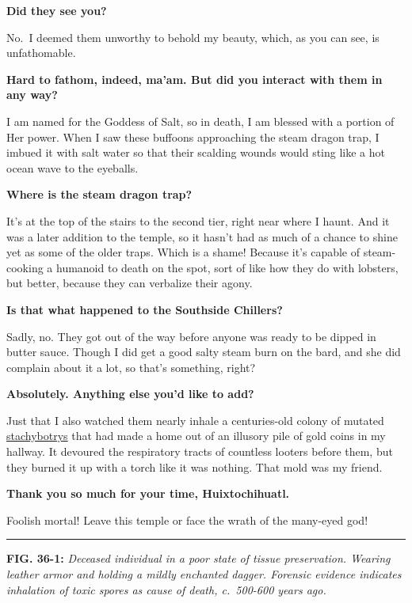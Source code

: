 \documentclass[smalldemyvopaper,11pt,twoside,onecolumn,openright,extrafontsizes]{memoir}
\begin{document}
\textbf{Did they see you?}

No.~I deemed them unworthy to behold my beauty, which, as you can see,
is unfathomable.

\textbf{Hard to fathom, indeed, ma'am. But did you interact with them in
any way?}

I am named for the Goddess of Salt, so in death, I am blessed with a
portion of Her power. When I saw these buffoons approaching the steam
dragon trap, I imbued it with salt water so that their scalding wounds
would sting like a hot ocean wave to the eyeballs.

\textbf{Where is the steam dragon trap?}

It's at the top of the stairs to the second tier, right near where I
haunt. And it was a later addition to the temple, so it hasn't had as
much of a chance to shine yet as some of the older traps. Which is a
shame! Because it's capable of steam-cooking a humanoid to death on the
spot, sort of like how they do with lobsters, but better, because they
can verbalize their agony.

\textbf{Is that what happened to the Southside Chillers?}

Sadly, no. They got out of the way before anyone was ready to be dipped
in butter sauce. Though I did get a good salty steam burn on the bard,
and she did complain about it a lot, so that's something, right?

\textbf{Absolutely. Anything else you'd like to add?}

Just that I also watched them nearly inhale a centuries-old colony of
mutated
\href{https://moldblogger.com/the-most-dangerous-molds/}{stachybotrys}
that had made a home out of an illusory pile of gold coins in my
hallway. It devoured the respiratory tracts of countless looters before
them, but they burned it up with a torch like it was nothing. That mold
was my friend.

\textbf{Thank you so much for your time, Huixtochihuatl.}

Foolish mortal! Leave this temple or face the wrath of the many-eyed
god!

\begin{center}\rule{0.5\linewidth}{\linethickness}\end{center}

\textbf{FIG. 36-1:} \emph{Deceased individual in a poor state of tissue
preservation. Wearing leather armor and holding a mildly enchanted
dagger. Forensic evidence indicates inhalation of toxic spores as cause
of death, c.~500-600 years ago.}
\end{document}
